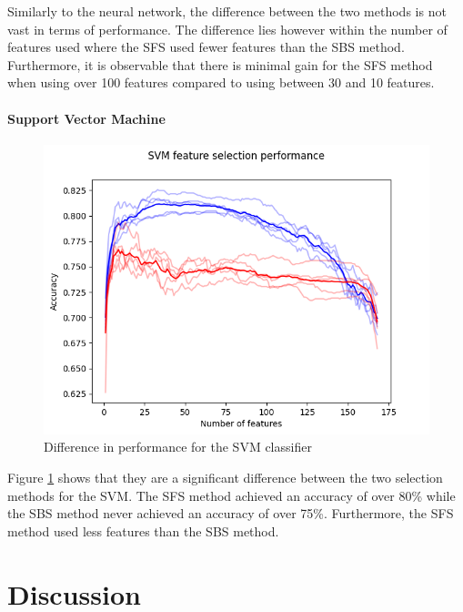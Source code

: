 \documentclass{kththesis}
\begin{document}
Similarly to the neural network, the difference between the two methods is not vast in terms of performance. The difference lies however within the number of features used where the SFS used fewer features than the SBS method. Furthermore, it is observable that there is minimal gain for the SFS method when using over 100 features compared to using between 30 and 10 features.

\newpage

\subsubsection{Support Vector Machine}

\begin{figure}[h!]
  \begin{center}
    \includegraphics[scale=0.8]{../new_plots/svm_graph.png}
    \caption{Difference in performance for the SVM classifier}
    \label{fig:svm}
  \end{center}
\end{figure}

Figure \ref{fig:svm} shows that they are a significant difference between the two selection methods for the SVM. The SFS method achieved an accuracy of over 80\% while the SBS method never achieved an accuracy of over 75\%. Furthermore, the SFS method used less features than the SBS method.

\chapter{Discussion}
\end{document}
